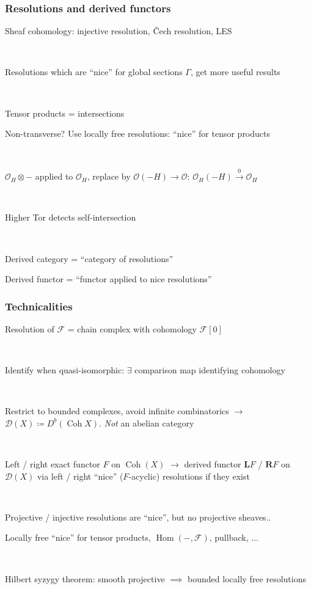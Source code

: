 \documentclass{beamer}
\DeclareMathOperator{\Hom}{Hom}
\DeclareMathOperator{\Coh}{Coh}
\renewcommand{\O}{\mathcal{O}}
\newcommand{\calD}{\mathcal{D}}
\newcommand{\calF}{\mathcal{F}}
\newcommand{\dL}[1]{\mathbf{L}#1}
\newcommand{\dR}[1]{\mathbf{R}#1}
\begin{document}
\begin{frame}
    \frametitle{Resolutions and derived functors}

    Sheaf cohomology: injective resolution, \v{C}ech resolution, LES

    ~

    Resolutions which are ``nice'' for global sections $\Gamma$, get more useful
    results %
    \pause

    ~

    Tensor products = intersections

    Non-transverse? Use locally free resolutions: ``nice'' for tensor products
    \pause

    ~

    $\O_H\otimes-$ applied to $\O_H$, \pause replace by $\O(-H)\to\O$:
    $\O_H(-H)\xrightarrow{0}\O_H$ \pause

    ~

    Higher Tor detects self-intersection \pause

    ~

    Derived category = ``category of resolutions''

    Derived functor = ``functor applied to nice resolutions''
\end{frame}

\begin{frame}
    \frametitle{Technicalities}

    Resolution of $\calF$ = chain complex with cohomology $\calF[0]$

    ~

    Identify when quasi-isomorphic: $\exists$ comparison map identifying
    cohomology

    ~

    Restrict to bounded complexes, avoid infinite combinatorics $\to$
    $\calD(X)\coloneqq D^b(\Coh X)$. \pause \emph{Not} an abelian category \pause

    ~

    Left / right exact functor $F$ on $\Coh(X)$ $\to$ derived functor $\dL F$ /
    $\dR F$ on $\calD(X)$ via left / right ``nice'' ($F$-acyclic) resolutions if
    they exist

    ~

    Projective / injective resolutions are ``nice'', but no projective sheaves..

    Locally free ``nice'' for tensor products, $\Hom(-,\calF)$, pullback, $\ldots$

    ~

    Hilbert syzygy theorem: smooth projective $\implies$ bounded locally free
    resolutions
\end{frame}
\end{document}
